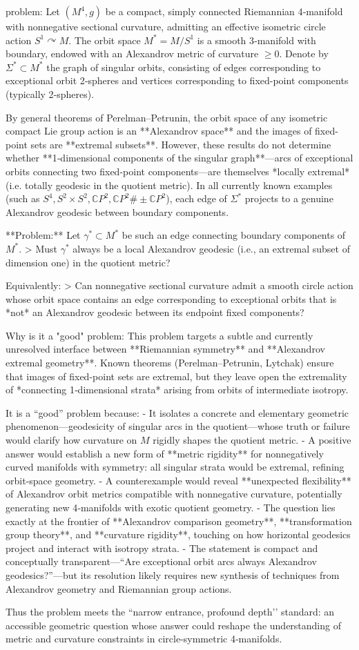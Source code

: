 problem:  
Let \( (M^4, g) \) be a compact, simply connected Riemannian 4‑manifold with nonnegative sectional curvature, admitting an effective isometric circle action \( S^1 \curvearrowright M \).  The orbit space \(M^* = M/S^1\) is a smooth 3‑manifold with boundary, endowed with an Alexandrov metric of curvature \( \ge 0 \).  Denote by \( \Sigma^* \subset M^* \) the graph of singular orbits, consisting of edges corresponding to exceptional orbit 2‑spheres and vertices corresponding to fixed-point components (typically 2‑spheres).

By general theorems of Perelman–Petrunin, the orbit space of any isometric compact Lie group action is an **Alexandrov space** and the images of fixed-point sets are **extremal subsets**.  However, these results do not determine whether **1‑dimensional components of the singular graph**—arcs of exceptional orbits connecting two fixed-point components—are themselves *locally extremal* (i.e. totally geodesic in the quotient metric).  In all currently known examples (such as \( S^4, S^2 \times S^2, \mathbb{C}P^2, \mathbb{C}P^2 \# \pm\mathbb{C}P^2 \)), each edge of \( \Sigma^* \) projects to a genuine Alexandrov geodesic between boundary components.

**Problem:**  
Let \( \gamma^* \subset M^* \) be such an edge connecting boundary components of \(M^*\).  
> Must \( \gamma^* \) always be a local Alexandrov geodesic (i.e., an extremal subset of dimension one) in the quotient metric?

Equivalently:  
> Can nonnegative sectional curvature admit a smooth circle action whose orbit space contains an edge corresponding to exceptional orbits that is *not* an Alexandrov geodesic between its endpoint fixed components?

Why is it a "good" problem:  
This problem targets a subtle and currently unresolved interface between **Riemannian symmetry** and **Alexandrov extremal geometry**.  Known theorems (Perelman–Petrunin, Lytchak) ensure that images of fixed-point sets are extremal, but they leave open the extremality of *connecting 1‑dimensional strata* arising from orbits of intermediate isotropy.  

It is a “good” problem because:
- It isolates a concrete and elementary geometric phenomenon—geodesicity of singular arcs in the quotient—whose truth or failure would clarify how curvature on \(M\) rigidly shapes the quotient metric.  
- A positive answer would establish a new form of **metric rigidity** for nonnegatively curved manifolds with symmetry: all singular strata would be extremal, refining orbit‑space geometry.  
- A counterexample would reveal **unexpected flexibility** of Alexandrov orbit metrics compatible with nonnegative curvature, potentially generating new 4‑manifolds with exotic quotient geometry.  
- The question lies exactly at the frontier of **Alexandrov comparison geometry**, **transformation group theory**, and **curvature rigidity**, touching on how horizontal geodesics project and interact with isotropy strata.  
- The statement is compact and conceptually transparent—“Are exceptional orbit arcs always Alexandrov geodesics?”—but its resolution likely requires new synthesis of techniques from Alexandrov geometry and Riemannian group actions.

Thus the problem meets the “narrow entrance, profound depth’’ standard: an accessible geometric question whose answer could reshape the understanding of metric and curvature constraints in circle‑symmetric 4‑manifolds.